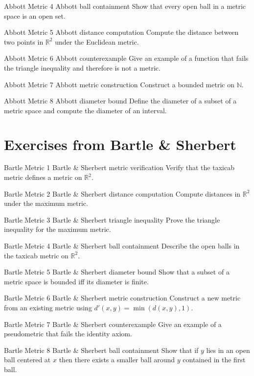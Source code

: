 \exstub
{Abbott Metric 4}
{Abbott}
{ball containment}
{Show that every open ball in a metric space is an open set.}

\exstub
{Abbott Metric 5}
{Abbott}
{distance computation}
{Compute the distance between two points in $\mathbb R^2$ under the Euclidean metric.}

\exstub
{Abbott Metric 6}
{Abbott}
{counterexample}
{Give an example of a function that fails the triangle inequality and
therefore is not a metric.}

\exstub
{Abbott Metric 7}
{Abbott}
{metric construction}
{Construct a bounded metric on $\mathbb N$.}

\exstub
{Abbott Metric 8}
{Abbott}
{diameter bound}
{Define the diameter of a subset of a metric space and compute the
diameter of an interval.}


\section*{Exercises from Bartle \& Sherbert}

\exstub
{Bartle Metric 1}
{Bartle \& Sherbert}
{metric verification}
{Verify that the taxicab metric defines a metric on $\mathbb R^2$.}

\exstub
{Bartle Metric 2}
{Bartle \& Sherbert}
{distance computation}
{Compute distances in $\mathbb R^2$ under the maximum metric.}

\exstub
{Bartle Metric 3}
{Bartle \& Sherbert}
{triangle inequality}
{Prove the triangle inequality for the maximum metric.}

\exstub
{Bartle Metric 4}
{Bartle \& Sherbert}
{ball containment}
{Describe the open balls in the taxicab metric on $\mathbb R^2$.}

\exstub
{Bartle Metric 5}
{Bartle \& Sherbert}
{diameter bound}
{Show that a subset of a metric space is bounded iff its diameter is finite.}

\exstub
{Bartle Metric 6}
{Bartle \& Sherbert}
{metric construction}
{Construct a new metric from an existing metric using
$d'(x,y)=\min(d(x,y),1)$.}

\exstub
{Bartle Metric 7}
{Bartle \& Sherbert}
{counterexample}
{Give an example of a pseudometric that fails the identity axiom.}

\exstub
{Bartle Metric 8}
{Bartle \& Sherbert}
{ball containment}
{Show that if $y$ lies in an open ball centered at $x$ then there exists
a smaller ball around $y$ contained in the first ball.}

